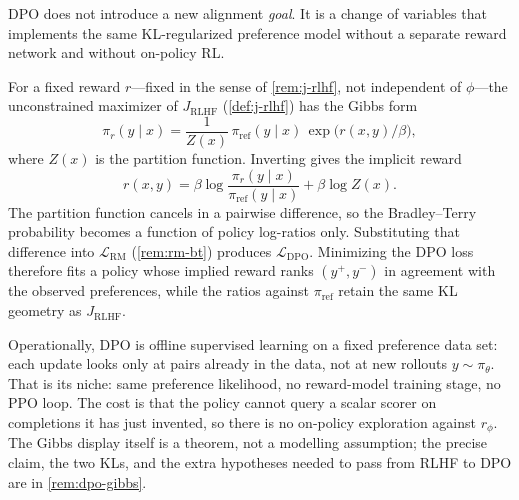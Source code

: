 \documentclass[11pt,a4paper]{article}
\theoremstyle{definition}
\begin{document}
\begin{remark}\label{rem:dpo}
DPO does not introduce a new alignment \emph{goal}. It is a change of variables that
implements the same KL-regularized preference model without a separate reward network
and without on-policy RL.

For a fixed reward $r$---fixed in the sense of \cref{rem:j-rlhf}, not independent
of $\phi$---the unconstrained maximizer of $J_{\mathrm{RLHF}}$
(\cref{def:j-rlhf}) has the Gibbs
form
\[
\pi_r(y\mid x)
=\frac{1}{Z(x)}\,
\pi_{\mathrm{ref}}(y\mid x)\,
\exp\bigl(r(x,y)/\beta\bigr),
\]
where $Z(x)$ is the partition function. Inverting gives the implicit reward
\[
r(x,y)
=\beta\log\frac{\pi_r(y\mid x)}{\pi_{\mathrm{ref}}(y\mid x)}+\beta\log Z(x).
\]
The partition function cancels in a pairwise difference, so the Bradley--Terry
probability becomes a function of policy log-ratios only. Substituting that difference
into $\mathcal{L}_{\mathrm{RM}}$ (\cref{rem:rm-bt}) produces $\mathcal{L}_{\mathrm{DPO}}$. Minimizing the
DPO loss therefore fits a policy whose implied reward ranks $(y^+,y^-)$ in agreement
with the observed preferences, while the ratios against $\pi_{\mathrm{ref}}$ retain the
same KL geometry as $J_{\mathrm{RLHF}}$.

Operationally, DPO is offline supervised learning on a fixed preference data set: each
update looks only at pairs already in the data, not at new rollouts
$y\sim\pi_\theta$. That is its niche: same preference likelihood, no reward-model
training stage, no PPO loop. The cost is that the policy cannot query a scalar scorer
on completions it has just invented, so there is no on-policy exploration against
$r_\phi$.
The Gibbs display itself is a theorem, not a modelling assumption; the precise
claim, the two KLs, and the extra hypotheses needed to pass from RLHF to DPO are
in \cref{rem:dpo-gibbs}.
\end{remark}
\end{document}
